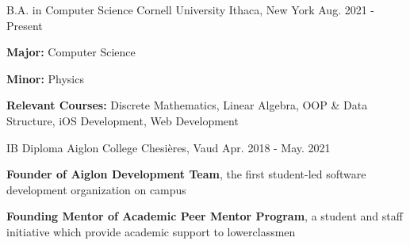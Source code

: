\begin{cventries}
  \cventry
    {B.A. in Computer Science}
    {Cornell University}
    {Ithaca, New York}
    {Aug. 2021 - Present}
    {
      \begin{cvitems}
      	\item {\textbf{Major:} Computer Science}
        \item {\textbf{Minor:} Physics}
        \item {\textbf{Relevant Courses:} Discrete Mathematics, Linear Algebra, OOP \& Data Structure, iOS Development, Web Development}
      \end{cvitems}
    }

\cventry
    {IB Diploma}
    {Aiglon College}
    {Chesières, Vaud}
    {Apr. 2018 - May. 2021}
    {
      \begin{cvitems}
        \item {\textbf{Founder of Aiglon Development Team}, the first student-led software development organization on campus}
        \item {\textbf{Founding Mentor of Academic Peer Mentor Program}, a student and staff initiative which provide academic support to lowerclassmen}
      \end{cvitems}
    }
\end{cventries}
